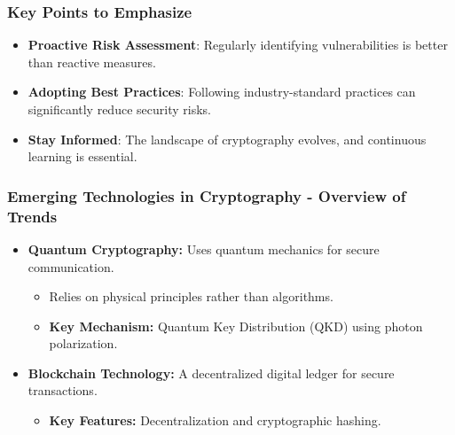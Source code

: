 \documentclass{beamer}
\begin{document}
\begin{frame}
    \frametitle{Key Points to Emphasize}
    \begin{itemize}
        \item \textbf{Proactive Risk Assessment}: Regularly identifying vulnerabilities is better than reactive measures.
        \item \textbf{Adopting Best Practices}: Following industry-standard practices can significantly reduce security risks.
        \item \textbf{Stay Informed}: The landscape of cryptography evolves, and continuous learning is essential.
    \end{itemize}
\end{frame}

\begin{frame}[fragile]
    \frametitle{Emerging Technologies in Cryptography - Overview of Trends}
    
    \begin{itemize}
        \item \textbf{Quantum Cryptography:} Uses quantum mechanics for secure communication.
        \begin{itemize}
            \item Relies on physical principles rather than algorithms.
            \item \textbf{Key Mechanism:} Quantum Key Distribution (QKD) using photon polarization.
        \end{itemize}
        
        \item \textbf{Blockchain Technology:} A decentralized digital ledger for secure transactions.
        \begin{itemize}
            \item \textbf{Key Features:} Decentralization and cryptographic hashing.
        \end{itemize}
    \end{itemize}
\end{frame}
\end{document}
